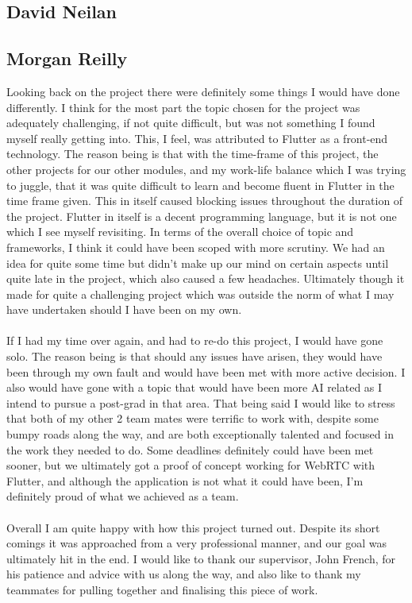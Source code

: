 \subsection{David Neilan}
\subsection{Morgan Reilly}
Looking back on the project there were definitely some things I would have done differently. I think for the most part the topic chosen for the project was adequately challenging, if not quite difficult, but was not something I found myself really getting into. This, I feel, was attributed to Flutter as a front-end technology. The reason being is that with the time-frame of this project, the other projects for our other modules, and my work-life balance which I was trying to juggle, that it was quite difficult to learn and become fluent in Flutter in the time frame given. This in itself caused blocking issues throughout the duration of the project. Flutter in itself is a decent programming language, but it is not one which I see myself revisiting. In terms of the overall choice of topic and frameworks, I think it could have been scoped with more scrutiny. We had an idea for quite some time but didn’t make up our mind on certain aspects until quite late in the project, which also caused a few headaches. Ultimately though it made for quite a challenging project which was outside the norm of what I may have undertaken should I have been on my own.
\\\\ If I had my time over again, and had to re-do this project, I would have gone solo. The reason being is that should any issues have arisen, they would have been through my own fault and would have been met with more active decision. I also would have gone with a topic that would have been more AI related as I intend to pursue a post-grad in that area. That being said I would like to stress that both of my other 2 team mates were terrific to work with, despite some bumpy roads along the way, and are both exceptionally talented and focused in the work they needed to do. Some deadlines definitely could have been met sooner, but we ultimately got a proof of concept working for WebRTC with Flutter, and although the application is not what it could have been, I’m definitely proud of what we achieved as a team. 
\\\\ Overall I am quite happy with how this project turned out. Despite its short comings it was approached from a very professional manner, and our goal was ultimately hit in the end. I would like to thank our supervisor, John French, for his patience and advice with us along the way, and also like to thank my teammates for pulling together and finalising this piece of work. 